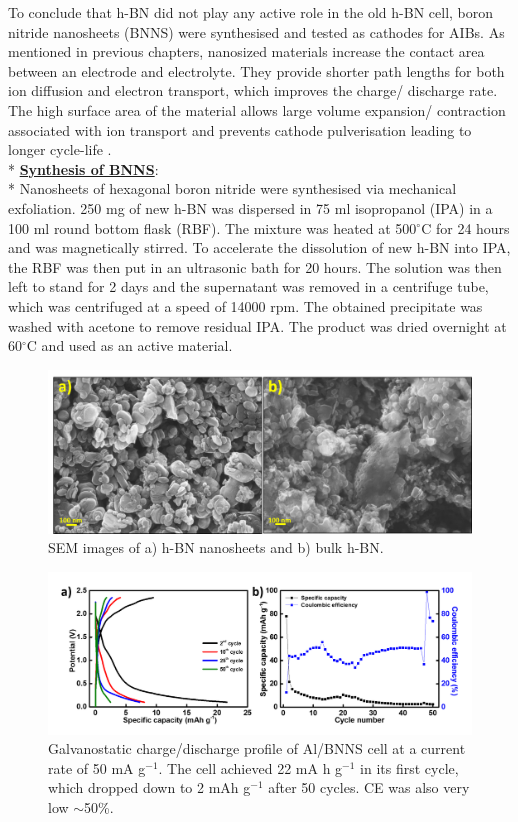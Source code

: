 To conclude that h-BN did not play any active role in the old h-BN cell, boron nitride nanosheets (BNNS) were synthesised and tested as cathodes for AIBs. As mentioned in previous chapters, nanosized materials increase the contact area between an electrode and electrolyte. They provide shorter path lengths for both ion diffusion and electron transport, which improves the charge/ discharge rate. The high surface area of the material allows large volume expansion/ contraction associated with ion transport and prevents cathode pulverisation leading to longer cycle-life \cite{zhang_ultrathin_2015,cong_intrinsic_2015}. \\*
\underline{\textbf{Synthesis of BNNS}}: \\*
Nanosheets of hexagonal boron nitride were synthesised via mechanical exfoliation. 250 mg of new h-BN was dispersed in 75 ml isopropanol (IPA) in a 100 ml round bottom flask (RBF). The mixture was heated at 500$^{\circ}$C for 24 hours and was magnetically stirred. To accelerate the dissolution of new h-BN into IPA, the RBF was then put in an ultrasonic bath for 20 hours. The solution was then left to stand for 2 days and the supernatant was removed in a centrifuge tube, which was centrifuged at a speed of 14000 rpm. The obtained precipitate was washed with acetone to remove residual IPA. The product was dried overnight at 60$^{\circ}$C and used as an active material. 

\begin{figure}[tbh!]
\centering
\includegraphics[width=\textwidth]{Figures/BOhBN/BNNSSEM}
\caption{SEM images of a) h-BN nanosheets and b) bulk h-BN.}
\label{Figures/BOhBN:BNNSSEM}
\end{figure}

\begin{figure}[tbh!]
\centering
\includegraphics[width=\textwidth]{Figures/BOhBN/BNNSCDCCE}
\caption{Galvanostatic charge/discharge profile of Al/BNNS cell at a current rate of 50 mA g$^{-1}$. The cell achieved 22 mA h g$^{-1}$ in its first cycle, which dropped down to 2 mAh g$^{-1}$ after 50 cycles. CE was also very low $\sim$50\%. }
\label{Figures/BOhBN:BNNSCDCCE}
\end{figure}

